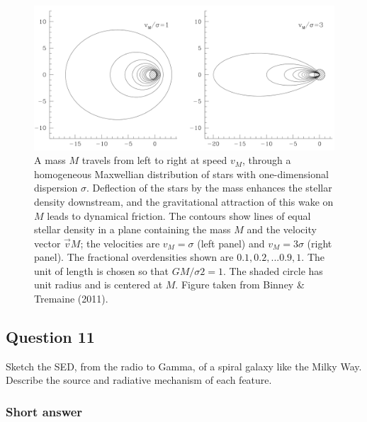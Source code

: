 \documentclass[a4paper,10pt]{article}
\begin{document}
\begin{figure}[t]
    \centering
    \includegraphics[width=14cm]{figures/DynamicalFriction.png}
    \caption{\footnotesize{A mass $M$ travels from left to right at speed $v_M$, through a homogeneous Maxwellian distribution of stars with one-dimensional dispersion $\sigma$. Deflection of the stars by the mass enhances the stellar density downstream, and the gravitational attraction of this wake on $M$ leads to dynamical friction. The contours show lines of equal stellar density in a plane containing the mass $M$ and the velocity vector $\vec{v}M$; the velocities are $v_M=\sigma$ (left panel) and $v_M=3\sigma$ (right panel). The fractional overdensities shown are $0.1,0.2, ... 0.9,1$. The unit of length is chosen so that $GM/\sigma2=1$. The shaded circle has unit radius and is centered at $M$. Figure taken from Binney \& Tremaine (2011).}}
    \label{fig:dynamicalfriction}
\end{figure}


\newpage
\subsection{Question 11}

Sketch the SED, from the radio to Gamma, of a spiral galaxy like the Milky Way. Describe the source and radiative mechanism of each feature.

\subsubsection{Short answer}
\end{document}
